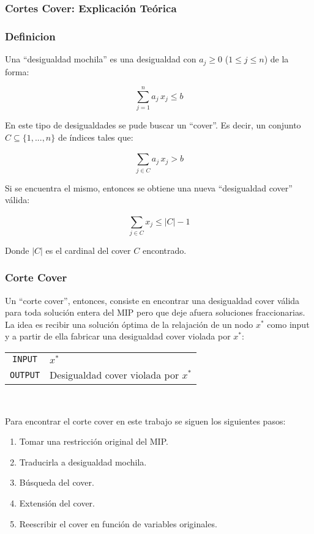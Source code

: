 \subsubsection{Cortes Cover: Explicación Teórica}

\subsubsection*{Definicion}
Una ``desigualdad mochila'' es una desigualdad con $a_j \geq 0$ ($1\leq j \leq n$) de la forma:

$$ \overset{n}{\underset{j=1}{\sum}} a_j\,x_j \leq b$$

En este tipo de desigualdades se pude buscar un ``cover''. Es decir, un conjunto $C \subseteq \{1,...,n\}$ de índices tales que:

$$ \overset{}{\underset{j \in C}{\sum}} a_j\,x_j > b$$

Si se encuentra el mismo, entonces se obtiene una nueva ``desigualdad cover'' válida:

$$ \overset{}{\underset{j \in C}{\sum}} x_j \leq |C| - 1$$

Donde $|C|$ es el cardinal del cover $C$ encontrado.

\subsubsection*{Corte Cover}

Un ``corte cover'', entonces, consiste en encontrar una desigualdad cover válida para toda solución entera del MIP pero que deje afuera soluciones fraccionarias. La idea es recibir una solución óptima de la relajación de un nodo $x^*$ como input y a partir de ella fabricar una desigualdad cover violada por $x^*$:\\

{
\centering
\begin{tabular}{c l}
\verb_INPUT_ & $x^*$\\
\verb_OUTPUT_ & Desigualdad cover violada por $x^*$\\
\end{tabular}\\
\vspace{5mm}
}

Para encontrar el corte cover en este trabajo se siguen los siguientes pasos:

\begin{enumerate}
\item Tomar una restricción original del MIP.
\item Traducirla a desigualdad mochila.
\item Búsqueda del cover.
\item Extensión del cover.
\item Reescribir el cover en función de variables originales.
\end{enumerate}

